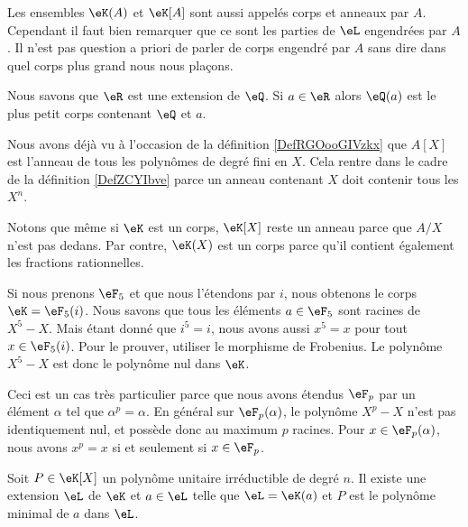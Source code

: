 \begin{remark}
    Les ensembles \( \eK(A)\) et \( \eK[A]\) sont aussi appelés corps et anneaux  par \( A\). Cependant il faut bien remarquer que ce sont les parties de \( \eL\) engendrées par \( A\). Il n'est pas question a priori de parler de corps engendré par \( A\) sans dire dans quel corps plus grand nous nous plaçons.
\end{remark}

\begin{example}
    Nous savons que \( \eR\) est une extension de \( \eQ\). Si \( a\in \eR\) alors \( \eQ(a)\) est le plus petit corps contenant \( \eQ\) et \( a\).
\end{example}

\begin{example}
    Nous avons déjà vu à l'occasion de la définition \ref{DefRGOooGIVzkx} que \( A[X]\) est l'anneau de tous les polynômes de degré fini en \( X\). Cela rentre dans le cadre de la définition \ref{DefZCYIbve} parce un anneau contenant \( X\) doit contenir tous les \( X^n\).

    Notons que même si \( \eK\) est un corps, \( \eK[X]\) reste un anneau parce que \( A/X\) n'est pas dedans. Par contre, \( \eK(X)\) est un corps parce qu'il contient également les fractions rationnelles.
\end{example}

\begin{example} \label{ExLQhLhJ}
    Si nous prenons \( \eF_5\) et que nous l'étendons par \( i\), nous obtenons le corps \( \eK=\eF_5(i)\). Nous savons que tous les éléments \( a\in \eF_5\) sont racines de \( X^5-X\). Mais étant donné que \( i^5=i\), nous avons aussi \( x^5=x\) pour tout \( x\in \eF_5(i)\). Pour le prouver, utiliser le morphisme de Frobenius. Le polynôme \( X^5-X\) est donc le polynôme nul dans \( \eK\).

    Ceci est un cas très particulier parce que nous avons étendus \( \eF_p\) par un élément \( \alpha\) tel que \( \alpha^p=\alpha\). En général sur \( \eF_p(\alpha)\), le polynôme \( X^p-X\) n'est pas identiquement nul, et possède donc au maximum \( p\) racines. Pour \( x\in \eF_p(\alpha)\), nous avons \( x^p=x\) si et seulement si \( x\in \eF_p\).
\end{example}

\begin{lemma}
    Soit \( P\in\eK[X]\) un polynôme unitaire irréductible de degré \( n\). Il existe une extension \( \eL\) de \( \eK\) et \( a\in \eL\) telle que \( \eL=\eK(a)\) et \( P\) est le polynôme minimal de \( a\) dans \( \eL\).
\end{lemma}

